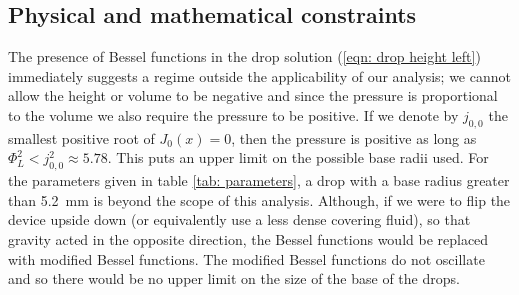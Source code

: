\documentclass{jfm}
\newcommand{\besselj}[2]{J_{#1}\!\left(#2\right)}
\begin{document}
\subsection{Physical and mathematical constraints}
\label{sec: constraints}

 The presence of Bessel functions in the drop solution (\ref{eqn: drop height left})  immediately suggests a regime outside the applicability  of our analysis; we cannot allow the height or volume  to be negative and since the pressure is proportional to the volume we also require the pressure to be positive.
 If we denote by  $  j_{0,0}$   the smallest positive root of $ \besselj{0}{x}=0$, then the pressure is positive as long as  $ \Phi_L^2<j^2_{0,0} \approx 5.78$. 
 This puts an upper limit on the possible base radii used.
 For the parameters given in table \ref{tab: parameters}, a drop with a base radius greater than \SI{5.2}{\milli \metre} is    beyond the scope of this  analysis.
 Although, if we were to flip the device upside down (or equivalently use a less dense covering fluid), so that gravity acted in the opposite direction, the Bessel functions would be replaced with modified Bessel functions.
 The modified Bessel functions do not oscillate and so there would be no upper limit on the size of the base of the drops.
\end{document}
